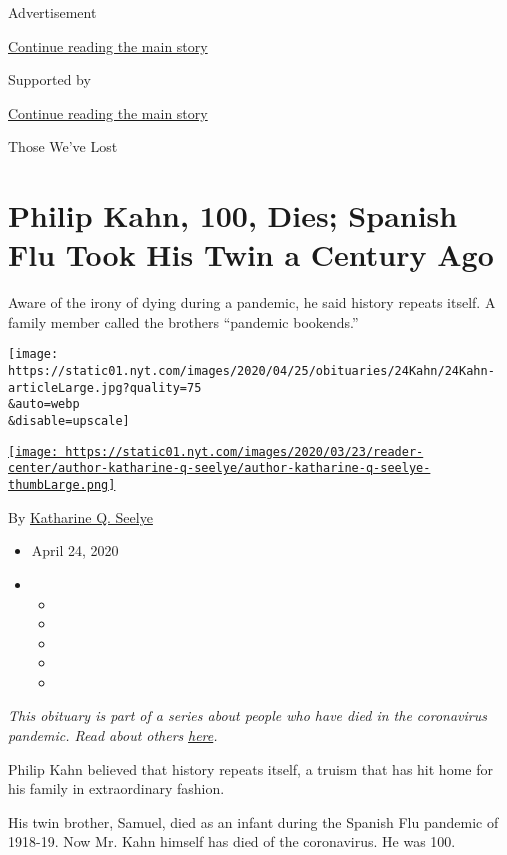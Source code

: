 Advertisement

\protect\hyperlink{after-top}{Continue reading the main story}

Supported by

\protect\hyperlink{after-sponsor}{Continue reading the main story}

Those We've Lost

\hypertarget{philip-kahn-100-dies-spanish-flu-took-his-twin-a-century-ago}{%
\section{Philip Kahn, 100, Dies; Spanish Flu Took His Twin a Century
Ago}\label{philip-kahn-100-dies-spanish-flu-took-his-twin-a-century-ago}}

Aware of the irony of dying during a pandemic, he said history repeats
itself. A family member called the brothers ``pandemic bookends.''

\texttt{[image: https://static01.nyt.com/images/2020/04/25/obituaries/24Kahn/24Kahn-articleLarge.jpg?quality=75\\\&auto=webp\\\&disable=upscale]}

\href{https://www.nytimes.com/by/katharine-q-seelye}{\texttt{[image: https://static01.nyt.com/images/2020/03/23/reader-center/author-katharine-q-seelye/author-katharine-q-seelye-thumbLarge.png]}}

By \href{https://www.nytimes.com/by/katharine-q-seelye}{Katharine Q.
Seelye}

\begin{itemize}
\item
  April 24, 2020
\item
  \begin{itemize}
  \item
  \item
  \item
  \item
  \item
  \end{itemize}
\end{itemize}

\emph{This obituary is part of a series about people who have died in
the coronavirus pandemic. Read about others}
\href{https://www.nytimes.com/series/people-who-have-died-of-the-coronavirus}{\emph{here}}\emph{.}

Philip Kahn believed that history repeats itself, a truism that has hit
home for his family in extraordinary fashion.

His twin brother, Samuel, died as an infant during the Spanish Flu
pandemic of 1918-19. Now Mr. Kahn himself has died of the coronavirus.
He was 100.

